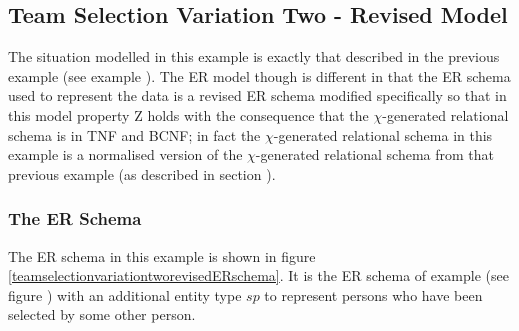 \subsection{Team Selection Variation Two - Revised Model}

The situation modelled in this example is exactly that described in the previous example (see example ). The ER model though is different in that the ER schema used to represent the data  is a revised ER schema modified specifically so that in this model property Z holds with the consequence that the $\chi$-generated relational schema is in TNF and BCNF;  in fact the $\chi$-generated relational schema in this example is a normalised version of the $\chi$-generated relational schema from that 
previous example (as described in section ).

\subsubsection{The ER Schema}
The ER schema in this example is shown in figure \ref{teamselectionvariationtworevisedERschema}. It is the ER schema of example  (see figure 
) with an additional entity type $sp$ to represent persons who have been selected by some other person.


